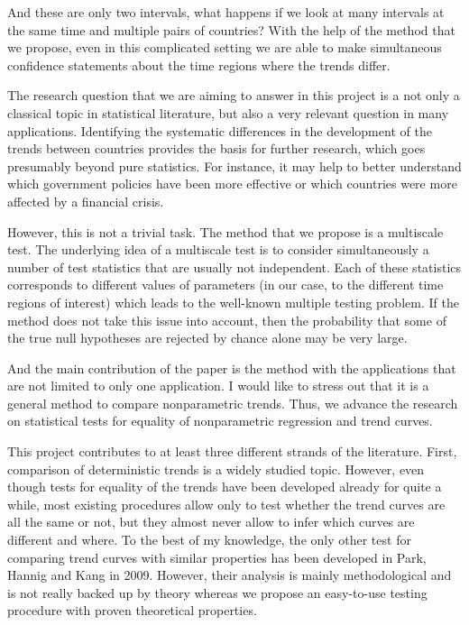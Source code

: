 \documentclass[a4paper,12pt]{article}
\begin{document}
And these are only two intervals, what happens if we look at many intervals at the same time and multiple pairs of countries? With the help of the method that we propose, even in this complicated setting we are able to make simultaneous confidence statements about the time regions where the trends differ.

The research question that we are aiming to answer in this project is a not only a classical topic in statistical literature, but also a very relevant question in many applications. Identifying the systematic differences in the development of the trends between countries provides the basis for further research, which goes presumably beyond pure statistics. For instance, it may help to better understand which government policies have been more effective or which countries were more affected by a financial crisis.

However, this is not a trivial task. The method that we propose is a multiscale test. The underlying idea of a multiscale test is to consider simultaneously a number of test statistics that are usually not independent. Each of these statistics corresponds to different values of parameters (in our case, to the different time regions of interest) which leads to the well-known multiple testing problem. If the method does not take this issue into account, then the probability that some of the true null hypotheses are rejected by chance alone may be very large.

And the main contribution of the paper is the method with the applications that are not limited to only one application. I would like to stress out that it is a general method to compare nonparametric trends. Thus, we advance the research on statistical tests for equality of nonparametric regression and trend curves.

This project contributes to at least three different strands of the literature. First, comparison of deterministic trends is a widely studied topic. However, even though tests for equality of the trends have been developed already for quite a while, most existing procedures allow only to test whether the trend curves are all the same or not, but they almost never allow to infer which curves are different and where. To the best of my knowledge, the only other test for comparing trend curves with similar properties has been developed in Park, Hannig and Kang in 2009. However, their analysis is mainly methodological and is not really backed up by theory whereas we propose an easy-to-use testing procedure with proven theoretical properties.
\end{document}
